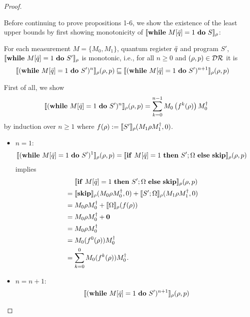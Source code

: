 \documentclass[a4paper,UKenglish,cleveref, autoref, thm-restate]{lipics-v2021}
\begin{document}
\begin{proof}
\begin{itemize}
        Before continuing to prove propositions 1-6, we show the existence of the least upper bounds by first showing monotonicity of $\llbracket \mathbf{while } \text{ }M[\Bar{q}]=1 \text{ }\mathbf{ do } \text{ }S \rrbracket_{\rho}$:
        \begin{claim}
        \label{cl:monoton}
        For each measurement $M=\{M_0,M_1\}$, quantum register $\Bar{q}$ and program $S'$, $\llbracket \mathbf{while } \text{ }M[\Bar{q}]=1 \text{ }\mathbf{ do } \text{ }S' \rrbracket_{\rho}$ is monotonic, i.e., for all $n \geq 0$ and $ (\rho,p) \in \mathcal{D}\mathcal{R}$ it is
        \begin{align*}
            \llbracket (\mathbf{while } \text{ }M[\Bar{q}]=1 \text{ }\mathbf{ do } \text{ }S')^{n} \rrbracket_{\rho}(\rho,p) &\sqsubseteq \llbracket (\mathbf{while } \text{ }M[\Bar{q}]=1 \text{ }\mathbf{ do } \text{ }S')^{n+1} \rrbracket_{\rho}(\rho,p)
        \end{align*}
        \end{claim}
        \begin{claimproof}
            First of all, we show
            \begin{align*}
                \llbracket (\mathbf{while } \text{ }M[\Bar{q}]=1 \text{ }\mathbf{ do } \text{ }S')^n \rrbracket_{\rho}(\rho,p) = \sum_{k=0}^{n-1} M_0 \left(f^k(\rho)\right) M_0 ^\dagger
            \end{align*}
            by induction over $n\geq 1$ where $f(\rho):=\llbracket S' \rrbracket_{\rho}(M_1 \rho M_1^\dagger,0)$.
\begin{itemize}
                \item $n=1$:
            \begin{align*}
                \llbracket (\mathbf{while } \text{ }M[\Bar{q}]=1 \text{ }\mathbf{ do } \text{ }S')^1 \rrbracket_{\rho}(\rho,p) =\llbracket \mathbf{if} \text{ }M[\Bar{q}]=1 \text{ } \mathbf{then} \text{ } S'; \Omega \text{ } \mathbf{else} \text{ } \mathbf{skip} \rrbracket_{\rho}(\rho,p)
            \end{align*}
            implies
            \begin{align*}
                &\phantom{=.}\llbracket \mathbf{if} \text{ }M[\Bar{q}]=1 \text{ } \mathbf{then} \text{ } S'; \Omega \text{ } \mathbf{else} \text{ } \mathbf{skip} \rrbracket_{\rho}(\rho,p) \\
                &= \llbracket \mathbf{skip}  \rrbracket_{\rho} (M_0 \rho M_0 ^\dagger ,0) + \llbracket S'; \Omega \rrbracket_{\rho} (M_1 \rho M_1 ^\dagger,0) \\
                &= M_0 \rho M_0 ^\dagger + \llbracket \Omega \rrbracket_{\rho}(f(\rho))\\
                &= M_0 \rho M_0^\dagger + \mathbf{0}\\
                &= M_0 \rho M_0^\dagger \\
                &= M_0 (f^0(\rho)) M_0 ^\dagger \\
                &= \sum_{k=0}^{0} M_0 (f^k(\rho)) M_0 ^\dagger .
            \end{align*}
            \item $n=n+1$:
            \begin{align*}
                &\phantom{=.}\semanticsRho{(\while')^{n+1}}(\rho,p) \\

\end{align*}
\end{itemize}
\end{claimproof}
\end{itemize}
\end{proof}
\end{document}
